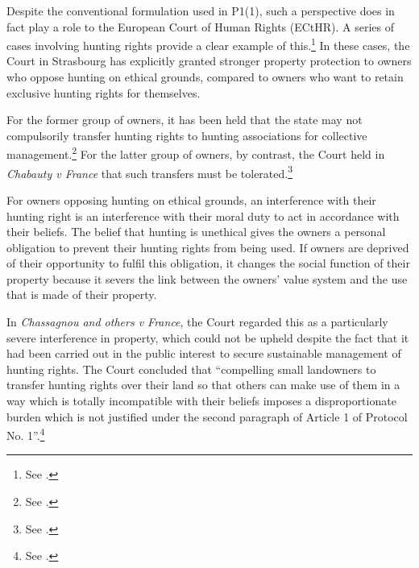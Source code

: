 Despite the conventional formulation used in P1(1), such a perspective does in fact play a role to the European Court of Human Rights (ECtHR).  A series of cases involving hunting rights provide a clear example of this.\footnote{See \cite{chassagnou99,hermann12,chabauty12}.} In these cases, the Court in Strasbourg has explicitly granted stronger property protection to owners who oppose hunting on ethical grounds, compared to owners who want to retain exclusive hunting rights for themselves.

For the former group of owners, it has been held that the state may not compulsorily transfer hunting rights to hunting associations for collective management.\footnote{See \cite{chassagnou99, hermann12}.} For the latter group of owners, by contrast, the Court held in {\it Chabauty v France} that such transfers must be tolerated.\footnote{See \cite{chabauty12}.}

For owners opposing hunting on ethical grounds, an interference with their hunting right is an interference with their moral duty to act in accordance with their beliefs. The belief that hunting is unethical gives the owners a personal obligation to prevent their hunting rights from being used. If owners are deprived of their opportunity to fulfil this obligation, it changes the social function of their property because it severs the link between the owners' value system and the use that is made of their property.

In {\it Chassagnou and others v France}, the Court regarded this as a particularly severe interference in property, which could not be upheld despite the fact that it had been carried out in the public interest to secure sustainable management of hunting rights. The Court concluded that ``compelling small landowners to transfer hunting rights over their land so that others can make use of them in a way which is totally incompatible with their beliefs imposes a disproportionate burden which is not justified under the second paragraph of Article 1 of Protocol No. 1''.\footnote{See \cite[85]{chassagnou99}.}

